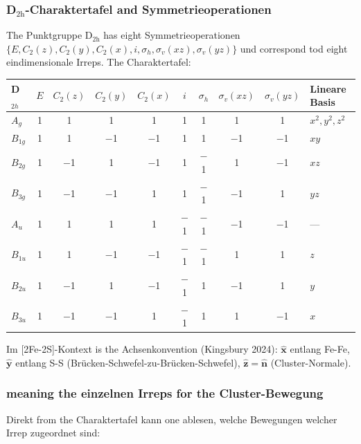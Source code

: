 \documentclass[11pt,a4paper,twoside]{article}
\theoremstyle{remark}
\begin{document}
\subsubsection*{D$_\mathrm{2h}$-Charaktertafel and Symmetrieoperationen}

The Punktgruppe D$_\mathrm{2h}$ has eight Symmetrieoperationen
$\{E, C_2(z), C_2(y), C_2(x), i, \sigma_h, \sigma_v(xz), \sigma_v(yz)\}$
und correspond tod eight eindimensionale Irreps. The Charaktertafel:

\begin{center}
\begin{tabular}{lccccccccl}
  \toprule
  \textbf{D$_{2h}$} & $E$ & $C_2(z)$ & $C_2(y)$ & $C_2(x)$ &
                     $i$ & $\sigma_h$ & $\sigma_v(xz)$ & $\sigma_v(yz)$ &
                     \textbf{Lineare Basis} \\
  \midrule
  $A_g$    & 1 & 1 & 1 & 1 & 1 & 1 & 1 & 1 & $x^2, y^2, z^2$ \\
  $B_{1g}$ & 1 & 1 & $-$1 & $-$1 & 1 & 1 & $-$1 & $-$1 & $xy$ \\
  $B_{2g}$ & 1 & $-$1 & 1 & $-$1 & 1 & $-$1 & 1 & $-$1 & $xz$ \\
  $B_{3g}$ & 1 & $-$1 & $-$1 & 1 & 1 & $-$1 & $-$1 & 1 & $yz$ \\
  $A_u$    & 1 & 1 & 1 & 1 & $-$1 & $-$1 & $-$1 & $-$1 & --- \\
  $B_{1u}$ & 1 & 1 & $-$1 & $-$1 & $-$1 & $-$1 & 1 & 1 & $z$ \\
  $B_{2u}$ & 1 & $-$1 & 1 & $-$1 & $-$1 & 1 & $-$1 & 1 & $y$ \\
  $B_{3u}$ & 1 & $-$1 & $-$1 & 1 & $-$1 & 1 & 1 & $-$1 & $x$ \\
  \bottomrule
\end{tabular}
\end{center}

Im [2Fe-2S]-Kontext is the Achsenkonvention (Kingsbury 2024):
$\hat{\mathbf{x}}$ entlang Fe-Fe, $\hat{\mathbf{y}}$ entlang S-S
(Br\"ucken-Schwefel-zu-Br\"ucken-Schwefel),
$\hat{\mathbf{z}} = \hat{\mathbf{n}}$ (Cluster-Normale).

\subsubsection*{meaning the einzelnen Irreps for the Cluster-Bewegung}

Direkt from the Charaktertafel kann one ablesen, welche Bewegungen
welcher Irrep zugeordnet sind:
\end{document}

